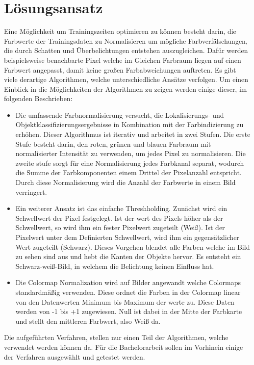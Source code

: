 \documentclass[a4paper,12pt,oneside]{article}
\begin{document}
  \section{Lösungsansatz}
  Eine Möglichkeit um Trainingszeiten optimieren zu können besteht darin, die Farbwerte 
  der Trainingsdaten zu Normalisieren um mögliche Farbverfälschungen, die durch Schatten und 
  Überbelichtungen entstehen auszugleichen. Dafür werden beispielsweise benachbarte Pixel 
  welche im Gleichen Farbraum liegen auf einen Farbwert angepasst, damit keine großen 
  Farbabweichungen auftreten. Es gibt viele derartige Algorithmen, welche unterschiedliche 
  Ansätze verfolgen. Um einen Einblick in die Möglichkeiten der Algorithmen zu zeigen werden 
  einige dieser, im folgenden Beschrieben:\vspace{1 cm}
  \begin{itemize}
  \item Die umfassende Farbnormalisierung versucht, die Lokalisierungs- und 
  Objektklassifizierungsergebnisse in Kombination mit der Farbindizierung zu erhöhen. Dieser 
  Algorithmus ist iterativ und arbeitet in zwei Stufen. Die erste Stufe besteht darin, den 
  roten, grünen und blauen Farbraum mit normalisierter Intensität zu verwenden, um jedes Pixel 
  zu normalisieren. Die zweite stufe sorgt für eine Normalisierung jedes Farbkanal separat, 
  wodurch die Summe der Farbkomponenten einem Drittel der Pixelanzahl entspricht. Durch diese 
  Normalisierung wird die Anzahl der Farbwerte in einem Bild verringert.
  \item Ein weiterer Ansatz ist das einfache Threshholding. Zunächst wird ein Schwellwert der 
  Pixel festgelegt. Ist der wert des Pixels höher als der Schwellwert, so wird ihm ein fester 
  Pixelwert zugeteilt (Weiß). Ist der Pixelwert unter dem Definierten Schwellwert, wird ihm ein 
  gegensätzlicher Wert zugeteilt (Schwarz). Dieses Vorgehen blendet alle Farben welche im Bild zu 
  sehen sind aus und hebt die Kanten der Objekte hervor. Es entsteht ein Schwarz-weiß-Bild, in 
  welchem die Belichtung keinen Einfluss hat.
  \item Die Colormap Normalization wird auf Bilder angewandt welche Colormaps standardmäßig 
  verwenden. Diese ordnet die Farben in der Colormap linear von den Datenwerten Minimum bis 
  Maximum der werte zu. Diese Daten werden von -1 bis +1 zugewiesen. Null ist dabei in der Mitte 
  der Farbkarte und stellt den mittleren Farbwert, also Weiß da.
  \end{itemize}   
  Die aufgeführten Verfahren, stellen nur einen Teil der Algorithmen, welche verwendet werden 
  können da. Für die Bachelorarbeit sollen im Vorhinein einige der Verfahren ausgewählt und 
  getestet werden.\vspace{1 cm}
\end{document}

